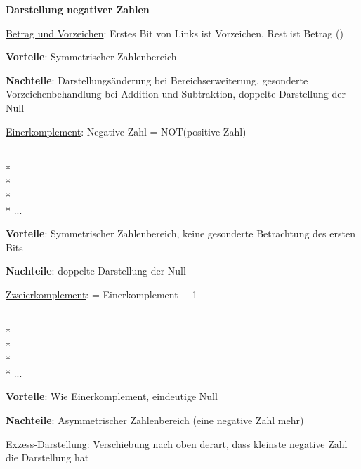 \textbf{Darstellung negativer Zahlen}
\begin{enumeration}
	\item \underline{Betrag und Vorzeichen}: Erstes Bit von Links ist Vorzeichen, Rest ist Betrag ()
	\begin{items}
		\item \textbf{Vorteile}: Symmetrischer Zahlenbereich
		\item \textbf{Nachteile}: Darstellungsänderung bei Bereichserweiterung, gesonderte Vorzeichenbehandlung bei Addition und Subtraktion, doppelte Darstellung der Null
	\end{items}

	\item \underline{Einerkomplement}: Negative Zahl = NOT(positive Zahl)
	\begin{center}
		 \quad {} \\*
		 \quad {} \\*
		 \quad {} \\*
		 \quad {} \\*
		...
	\end{center}
	\begin{items}
		\item \textbf{Vorteile}: Symmetrischer Zahlenbereich, keine gesonderte Betrachtung des ersten Bits
		\item \textbf{Nachteile}: doppelte Darstellung der Null
	\end{items}

	\item \underline{Zweierkomplement}: = Einerkomplement + 1
	\begin{center}
		 \quad {} \\*
		 \quad {} \\*
		 \quad {} \\*
		 \quad {} \\*
		...
	\end{center}
	\begin{items}
		\item \textbf{Vorteile}: Wie Einerkomplement, eindeutige Null
		\item \textbf{Nachteile}: Asymmetrischer Zahlenbereich (eine negative Zahl mehr)
	\end{items}

	\item \underline{Exzess-Darstellung}: Verschiebung nach oben derart, dass kleinste negative Zahl die Darstellung  hat
\end{enumeration}

